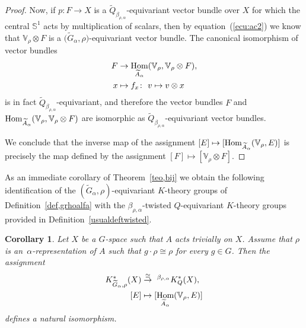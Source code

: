 \documentclass[10pt,a4paper]{amsart}
\def\S{\mathbb{S}}
\def\V{\mathbb{V}}
\DeclareMathOperator{\Hom}{\textup{Hom}}
\newtheorem{Cor}[Th]{Corollary}
\theoremstyle{definition}
\numberwithin{equation}{section}
\begin{document}
\begin{proof}
Now, if $p\colon F\rightarrow X$ is a
$\widetilde{Q}_{\beta_{\rho,\alpha}}$-equivariant vector bundle over $X$
for which the central $\S^{1}$ acts by multiplication of
scalars, then by equation~(\ref{ecu:ac2}) we know that
$\V_{\rho}\otimes F$ is a
$\big(\widetilde{G}_{\alpha},\rho\big)$-equivariant vector bundle.
The canonical isomorphism of vector bundles
\begin{align*}
F&\rightarrow \Hom_{\widetilde{A}_{\alpha}}(
\V_{\rho}, \V_{\rho}\otimes F),
\\
x&\mapsto f_{x}\colon\ v\mapsto v\otimes x
\end{align*}
is in fact $\widetilde{Q}_{\beta_{\rho,\alpha}}$-equivariant, and therefore the vector
bundles $F$ and
$\Hom_{\widetilde{A}_{\alpha}}(\V_{\rho},\V_{\rho}\otimes
F)$ are isomorphic as
$\widetilde{Q}_{\beta_{\rho,\alpha}}$-equivariant vector bundles.
	
We conclude that the inverse map of the assignment
$[E]\mapsto[\Hom_{\widetilde{A}_{\alpha}}(\V_{\rho},E)]$
is precisely the map defined by the assignment $[F]\mapsto
[\V_{\rho}\otimes F]$.
\end{proof}


As an immediate corollary of Theorem~\ref{teo,bij} we obtain the following
identification of the $(\widetilde{G}_{\alpha}, \rho)$-equivariant $K$-theory groups of
Definition~\ref{def,grhoalfa} with the $\beta_{\rho,\alpha}$-twisted $Q$-equivariant
$K$-theory groups provided in Definition~\ref{usualdeftwisted}.

\begin{Cor}\label{identification}
Let $X$ be a $G$-space such that $A$ acts trivially on $X$. Assume that
$\rho$ is an~$\alpha$-re\-p\-resentation of $A$ such that
$g\cdot \rho\cong \rho$ for every $g\in G$. Then the assignment
\begin{align*}
K^{\ast}_{\widetilde{G}_{\alpha}, \rho}(X)
&\stackrel{\cong}{\rightarrow} \ ^{\beta_{\rho,\alpha}}K^{\ast}_{Q}(X),
\\
[E]&\mapsto [\Hom_{\widetilde{A}_{\alpha}}(\V_{\rho},E)]
\end{align*}
defines a natural isomorphism.
\end{Cor}
\end{document}

